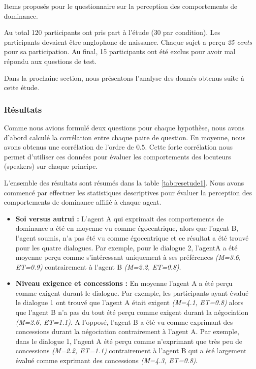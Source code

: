 {\begin{table}[h]
							\caption{Items proposés pour le questionnaire sur la perception des comportements de dominance.}
							\label{table:questionnaire}
						\end{table}
					
					Au total 120 participants ont pris part à l'étude (30 par condition). Les participants devaient être anglophone de naissance. Chaque sujet a perçu \textit{25 cents} pour sa participation. Au final, 15 participants ont été exclus pour avoir mal répondu aux questions de test. 
					
					Dans la prochaine section, nous présentons l'analyse des donnés obtenus suite à cette étude.
					
					
			\subsubsection{Résultats}
				Comme nous avions formulé deux questions pour chaque hypothèse, nous avons d'abord calculé la corrélation entre chaque paire de question. En moyenne, nous avons obtenus une corrélation de l'ordre de $0.5$. Cette forte corrélation nous permet d'utiliser ces données pour évaluer les comportements des locuteurs (speakers) sur chaque principe. 
				
				L'ensemble des résultats sont résumés dans la table \ref{tab:resetude1}. Nous avons commencé par effectuer les statistiques descriptives pour évaluer la perception des comportements de dominance affilié à chaque agent. 
					\begin{itemize}
							\item \textbf{Soi versus autrui :} L'agent A qui exprimait des comportements de dominance a été en moyenne vu comme égocentrique, alors que l'agent B, l'agent soumis, n'a pas été vu comme égocentrique et ce résultat a été trouvé pour les quatre dialogues.
							Par exemple, pour le dialogue 2, l'agentA a été moyenne perçu comme s'intéressant uniquement à ses préférences \textit{(M=3.6, ET=0.9)} contrairement à l'agent B \textit{(M=2.2, ET=0.8)}.
							
							\item \textbf{Niveau exigence et concessions :} En moyenne l'agent A a été perçu comme exigent durant le dialogue. Par exemple, les participants ayant évalué le dialogue 1 ont trouvé que l'agent A était exigent \textit{(M=4.1, ET=0.8)} alors que l'agent B n'a pas du tout été perçu comme exigent durant la négociation \textit{(M=2.6, ET=1.1)}. A l'opposé, l'agent B a été vu comme exprimant des concessions durant la négociation contrairement à l'agent A. Par exemple, dans le dialogue 1, l'agent A été perçu comme n'exprimant que très peu de concessions \textit{(M=2.2, ET=1.1)} contrairement à l'agent B qui a été largement évalué comme exprimant des concessions \textit{(M=4.3, ET=0.8)}.
							

\end{itemize}}
